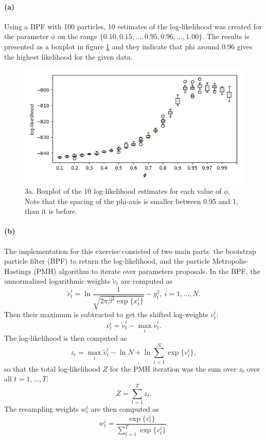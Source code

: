 \documentclass{article}
\begin{document}
\paragraph{(a)} Using a BPF with 100 particles, 10 estimates of the log-likelihood was created for the parameter $\phi$ on the range $ \{0.10, 0.15,\dots, 0.95, 0.96,\dots, 1.00\} $.
The results is presented as a boxplot in figure \ref{fig:3_a_new} and they indicate that phi around 0.96 gives the highest likelihood for the given data.
	\begin{figure}[t]
		\centering
		\includegraphics[width=\linewidth]{3_a_new}
		\caption{3a. Boxplot of the 10 log-likelihood estimates for each value of $\phi$. Note that the spacing of the phi-axis is smaller between 0.95 and 1, than it is before.}
		\label{fig:3_a_new}
	\end{figure}

\paragraph{(b)} The implementation for this exercise consisted of two main parts: the bootstrap particle filter (BPF) to return the log-likelihood, and the particle Metropolis-Hastings (PMH) algorithm to iterate over parameters proposals.
In the BPF, the unnormalized logarithmic weights $\tilde{v}_t$ are computed as
	\begin{equation}
		\tilde{v}_t^i = \ln\dfrac{1}{\sqrt{2\pi\beta^2\exp\{x^i_t\}}} - y_t^2,~i=1,\dots, N.
	\end{equation}
Then their maximum is subtracted to get the shifted log-weights $v_t^i$:
	\begin{equation}
		v_t^i = \tilde{v}_t^i - \max_i \tilde{v}_t^i.
	\end{equation}
The log-likelihood is then computed as
	\begin{equation}
		z_t = \max_i \tilde{v}_t^i - \ln N + \ln\sum_{i=1}^{N}\exp\{v_t^i\},
	\end{equation}
so that the total log-likelihood $Z$ for the PMH iteration was the sum over $z_t$ over all $t=1,\dots, T$:
	\begin{equation}
		Z = \sum_{t=1}^{T} z_t.
	\end{equation}
The resampling weights $w_t^i$ are then computed as 
	\begin{equation}
		w_t^i = \dfrac{\exp\{v_t^i\}}{\sum_{t=1}^T\exp\{v_t^i\}}.
	\end{equation}
\end{document}
